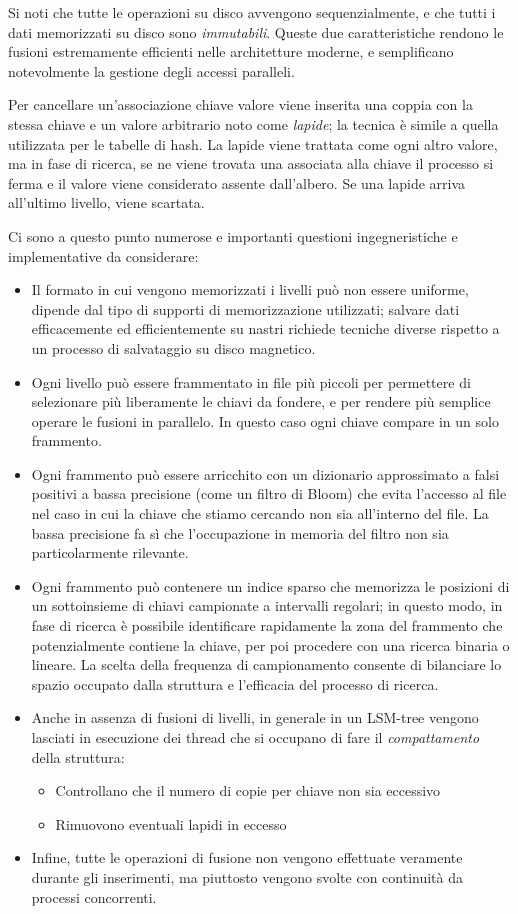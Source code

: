 Si noti che tutte le operazioni su disco avvengono sequenzialmente, e che tutti i dati memorizzati su disco sono \textit{immutabili}. Queste due caratteristiche rendono le fusioni estremamente efficienti nelle architetture moderne, e semplificano notevolmente la gestione degli accessi paralleli.

Per cancellare un'associazione chiave valore viene inserita una coppia con la stessa chiave e un valore arbitrario noto come \textit{lapide}; la tecnica è simile a quella utilizzata per le tabelle di hash. La lapide viene trattata come ogni altro valore, ma in fase di ricerca, se ne viene trovata una associata alla chiave il processo si ferma e il valore viene considerato assente dall'albero. Se una lapide arriva all'ultimo livello, viene scartata.

Ci sono a questo punto numerose e importanti questioni ingegneristiche e implementative da considerare:
\begin{itemize}
    \item Il formato in cui vengono memorizzati i livelli può non essere uniforme, dipende dal tipo di supporti di memorizzazione utilizzati; salvare dati efficacemente ed efficientemente su nastri richiede tecniche diverse rispetto a un processo di salvataggio su disco magnetico.
    \item Ogni livello può essere frammentato in file più piccoli per permettere di selezionare più liberamente le chiavi da fondere, e per rendere più semplice operare le fusioni in parallelo. In questo caso ogni chiave compare in un solo frammento.
    \item Ogni frammento può essere arricchito con un dizionario approssimato a falsi positivi a bassa precisione (come un filtro di Bloom) che evita l'accesso al file nel caso in cui la chiave che stiamo cercando non sia all'interno del file. La bassa precisione fa sì che l'occupazione in memoria del filtro non sia particolarmente rilevante.
    \item Ogni frammento può contenere un indice sparso che memorizza le posizioni di un sottoinsieme di chiavi campionate a intervalli regolari; in questo modo, in fase di ricerca è possibile identificare rapidamente la zona del frammento che potenzialmente contiene la chiave, per poi procedere con una ricerca binaria o lineare. La scelta della frequenza di campionamento consente di bilanciare lo spazio occupato dalla struttura e l'efficacia del processo di ricerca.
    \item Anche in assenza di fusioni di livelli, in generale in un LSM-tree vengono lasciati in esecuzione dei thread che si occupano di fare il \textit{compattamento} della struttura:
    \begin{itemize}
        \item Controllano che il numero di copie per chiave non sia eccessivo
        \item Rimuovono eventuali lapidi in eccesso
    \end{itemize}
    \item Infine, tutte le operazioni di fusione non vengono effettuate veramente durante gli inserimenti, ma piuttosto vengono svolte con continuità da processi concorrenti.
\end{itemize}
